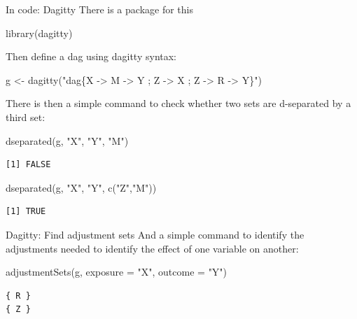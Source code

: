 \documentclass[
  11pt,
  ignorenonframetext,
]{beamer}
\newenvironment{Shaded}{\begin{snugshade}}{\end{snugshade}}
\newcommand{\AttributeTok}[1]{\textcolor[rgb]{0.40,0.45,0.13}{#1}}
\newcommand{\FunctionTok}[1]{\textcolor[rgb]{0.28,0.35,0.67}{#1}}
\newcommand{\NormalTok}[1]{\textcolor[rgb]{0.00,0.23,0.31}{#1}}
\newcommand{\OtherTok}[1]{\textcolor[rgb]{0.00,0.23,0.31}{#1}}
\newcommand{\StringTok}[1]{\textcolor[rgb]{0.13,0.47,0.30}{#1}}
\begin{document}
\begin{frame}[fragile]{In code: Dagitty}
\protect\hypertarget{in-code-dagitty}{}
There is a package for this

\begin{Shaded}
\begin{Highlighting}[]
\FunctionTok{library}\NormalTok{(dagitty)}
\end{Highlighting}
\end{Shaded}

Then define a dag using dagitty syntax:

\begin{Shaded}
\begin{Highlighting}[]
\NormalTok{g }\OtherTok{\textless{}{-}} \FunctionTok{dagitty}\NormalTok{(}\StringTok{"dag\{X {-}\textgreater{} M {-}\textgreater{} Y ; Z {-}\textgreater{} X ; Z {-}\textgreater{} R {-}\textgreater{} Y\}"}\NormalTok{)}
\end{Highlighting}
\end{Shaded}

There is then a simple command to check whether two sets are d-separated
by a third set:

\begin{Shaded}
\begin{Highlighting}[]
\FunctionTok{dseparated}\NormalTok{(g, }\StringTok{"X"}\NormalTok{, }\StringTok{"Y"}\NormalTok{, }\StringTok{"M"}\NormalTok{)}
\end{Highlighting}
\end{Shaded}

\begin{verbatim}
[1] FALSE
\end{verbatim}

\begin{Shaded}
\begin{Highlighting}[]
\FunctionTok{dseparated}\NormalTok{(g, }\StringTok{"X"}\NormalTok{, }\StringTok{"Y"}\NormalTok{, }\FunctionTok{c}\NormalTok{(}\StringTok{"Z"}\NormalTok{,}\StringTok{"M"}\NormalTok{))}
\end{Highlighting}
\end{Shaded}

\begin{verbatim}
[1] TRUE
\end{verbatim}
\end{frame}

\begin{frame}[fragile]{Dagitty: Find adjustment sets}
\protect\hypertarget{dagitty-find-adjustment-sets}{}
And a simple command to identify the adjustments needed to identify the
effect of one variable on another:

\begin{Shaded}
\begin{Highlighting}[]
\FunctionTok{adjustmentSets}\NormalTok{(g, }\AttributeTok{exposure =} \StringTok{"X"}\NormalTok{, }\AttributeTok{outcome =} \StringTok{"Y"}\NormalTok{)}
\end{Highlighting}
\end{Shaded}

\begin{verbatim}
{ R }
{ Z }
\end{verbatim}
\end{frame}
\end{document}
